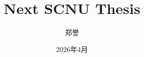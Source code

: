\documentclass{NEXT-SCNUThesis}
\title{Next SCNU Thesis} %
\author{郑誉} %
\date{2026年4月} %
\begin{document}
    \maketitle

    \begin{abstracten}
        
    \end{abstracten}

    \begin{abstractzh}
        
    \end{abstractzh}

    \toc

    


    \appendix
    

    \acknowledgements
    

\end{document}
